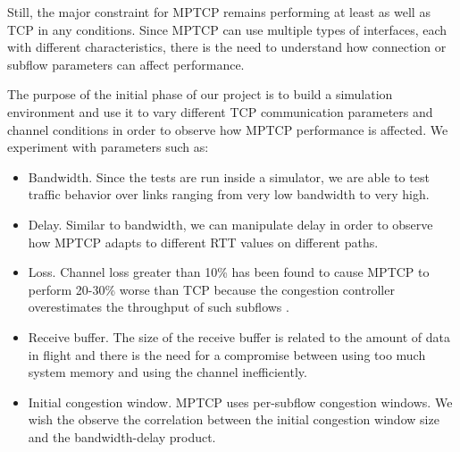 Still, the major constraint for MPTCP remains performing at least as well as TCP in any conditions. Since MPTCP can use multiple types of interfaces, each with different characteristics, there is the need to understand how connection or subflow parameters can affect performance.

The purpose of the initial phase of our project is to build a simulation environment and use it to vary different TCP communication parameters and channel conditions in order to observe how MPTCP performance is affected. We experiment with parameters such as:
\begin{itemize}
\item Bandwidth. Since the tests are run inside a simulator, we are able to test traffic behavior over links ranging from very low bandwidth to very high.
\item Delay. Similar to bandwidth, we can manipulate delay in order to observe how MPTCP adapts to different RTT values on different paths.
\item Loss. Channel loss greater than 10\% has been found to cause MPTCP to
perform 20-30\% worse than TCP because the congestion controller overestimates
the throughput of such subflows \cite{how-hard-can-it-be}.
\item Receive buffer. The size of the receive buffer is related to the amount
of data in flight and there is the need for a compromise between using too
much system memory and using the channel inefficiently.
\item Initial congestion window. MPTCP uses per-subflow congestion windows.
We wish the observe the correlation between the initial congestion window
size and the bandwidth-delay product.
\end{itemize}
